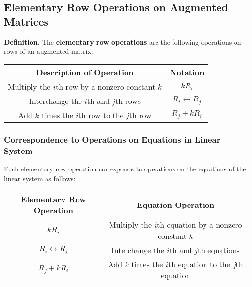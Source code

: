 \documentclass[../ma2001_notes.tex]{subfiles}
\begin{document}
\subsection{Elementary Row Operations on Augmented Matrices}
\textbf{Definition.} The \textbf{elementary row operations} are the following operations on rows of an augmented matrix:
\begin{center}
\begin{tabular}{|c|c|}
\hline
\textbf{Description of Operation} & \textbf{Notation} \\
\hline
Multiply the \(i\)th row by a nonzero constant \(k\) & \(kR_i\) \\
\hline
Interchange the \(i\)th and \(j\)th rows & \(R_i\leftrightarrow R_j\) \\
\hline
Add \(k\) times the \(i\)th row to the \(j\)th row & \(R_j+kR_i\) \\
\hline
\end{tabular}
\end{center}

\subsubsection{Correspondence to Operations on Equations in Linear System}
Each elementary row operation corresponds to operations on the equations of the linear system as follows:
\begin{center}
\begin{tabular}{|c|c|}
\hline
\textbf{Elementary Row Operation} & \textbf{Equation Operation} \\
\hline
\(kR_i\) & Multiply the \(i\)th equation by a nonzero constant \(k\) \\
\hline
\(R_i\leftrightarrow R_j\) & Interchange the \(i\)th and \(j\)th equations \\
\hline
\(R_j+kR_i\) & Add \(k\) times the \(i\)th equation to the \(j\)th equation \\
\hline
\end{tabular}
\end{center}
\end{document}
